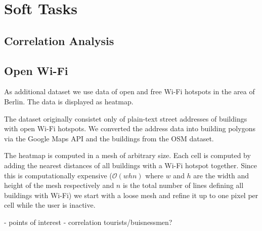 \section*{Soft Tasks}
\subsection*{Correlation Analysis}

\todo{}

\subsection*{Open Wi-Fi}

As additional dataset we use data of open and free Wi-Fi hotspots in
the area of Berlin.
The data is displayed as heatmap.

The dataset originally consistet only of plain-text street addresses
of buildings with open Wi-Fi hotspots. We converted the
address data into building polygons via the Google Maps
API and the buildings from the OSM dataset.

The heatmap is computed in a mesh of
arbitrary size. Each cell is computed by adding
the nearest distances of all buildings with a Wi-Fi
hotspot together.
Since this is computationally expensive ($\mathcal{O}(whn)$ where $w$ and $h$
are the width and height of the mesh respectively and $n$ is the total number of lines
defining all buildings with Wi-Fi)
we start with a loose mesh and refine it up to one pixel per cell while the
user is inactive.

- points of interest
- correlation tourists/buisnessmen?